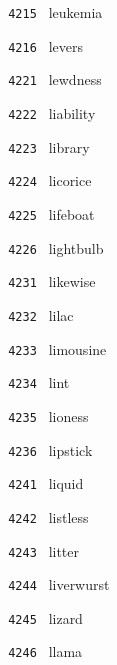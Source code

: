 \documentclass[11pt]{article}
\begin{document}
\begin{multicols}{6}
\noindent \texttt{ 4215 } \hspace{1mm} leukemia  \par
\noindent \texttt{ 4216 } \hspace{1mm} levers  \par
\noindent \texttt{ 4221 } \hspace{1mm} lewdness  \par
\noindent \texttt{ 4222 } \hspace{1mm} liability  \par
\noindent \texttt{ 4223 } \hspace{1mm} library  \par
\noindent \texttt{ 4224 } \hspace{1mm} licorice  \par
\noindent \texttt{ 4225 } \hspace{1mm} lifeboat  \par
\noindent \texttt{ 4226 } \hspace{1mm} lightbulb  \par
\noindent \texttt{ 4231 } \hspace{1mm} likewise  \par
\noindent \texttt{ 4232 } \hspace{1mm} lilac  \par
\noindent \texttt{ 4233 } \hspace{1mm} limousine  \par
\noindent \texttt{ 4234 } \hspace{1mm} lint  \par
\noindent \texttt{ 4235 } \hspace{1mm} lioness  \par
\noindent \texttt{ 4236 } \hspace{1mm} lipstick  \par
\noindent \texttt{ 4241 } \hspace{1mm} liquid  \par
\noindent \texttt{ 4242 } \hspace{1mm} listless  \par
\noindent \texttt{ 4243 } \hspace{1mm} litter  \par
\noindent \texttt{ 4244 } \hspace{1mm} liverwurst  \par
\noindent \texttt{ 4245 } \hspace{1mm} lizard  \par
\noindent \texttt{ 4246 } \hspace{1mm} llama  \par

\end{multicols}
\end{document}
